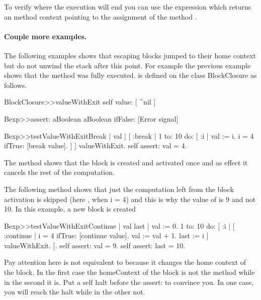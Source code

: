 \documentclass[a4paper,10pt,twoside]{book}
\begin{document}
To verify where the execution will end you can use the expression  which returns an method context pointing to the assignment of the method .

\paragraph{Couple more examples.}
The following examples shows that escaping blocks jumped to their home context but do not unwind the stack after this point. For example the previous example shows that the method  was fully executed. 
 is defined on the class BlockClosure as follows.

\begin{code}{}
BlockClosure>>valueWithExit 
	  self value: [ ^nil ]
\end{code}

\begin{code}{}
Bexp>>assert: aBoolean
	aBoolean ifFalse: [Error signal]

Bexp>>testValueWithExitBreak
	| val |
	[ :break |
	    1 to: 10 do: [ :i |
			val := i.
			i = 4 ifTrue: [break value].
		] 
	] valueWithExit.
	self assert: val = 4.
\end{code}

The method  shows that the block  is created and activated once and as effect it cancels the rest of the computation. 

The following method  shows that just the computation left from the block activation is skipped (here , when i = 4) and this is why the value of  is 9 and not 10. 
In this example, a new block is created 


\begin{code}{}
Bexp>>testValueWithExitContinue
	| val last |	
	val := 0. 
	1 to: 10 do: [ :i |
		[ :continue |
			i = 4 ifTrue: [continue value].
			val := val + 1.
			last := i
		] valueWithExit.
	].
	self assert: val = 9.
	self assert: last = 10.	
\end{code}

Pay attention here  is not equivalent to  because it changes the home context of the block. 
In the first case the homeContext of the block is not the method  while in the second it is.
Put a self halt before the assert: to convince you. In one case, you will reach the halt while in the other not. 
\end{document}

